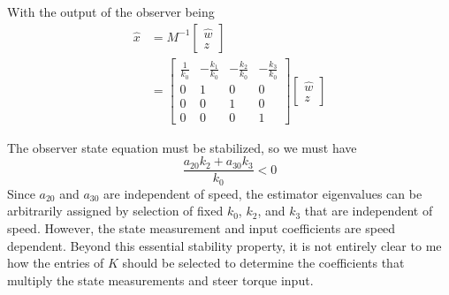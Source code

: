 \documentclass[letterpaper,11pt]{article}
\begin{document}
With the output of the observer being
\begin{align*}
\hat{x} &= M^{-1} \left[\begin{smallmatrix}\hat{w} \\ z\end{smallmatrix}\right] \\
  &= \left[\begin{smallmatrix}\frac{1}{k_{0}} & - \frac{k_{1}}{k_{0}} & -
  \frac{k_{2}}{k_{0}} & - \frac{k_{3}}{k_{0}}\\0 & 1 & 0 & 0\\0 & 0 & 1 & 0\\0
  & 0 & 0 & 1\end{smallmatrix}\right]\left[\begin{smallmatrix}\hat{w} \\ z\end{smallmatrix}\right]
\end{align*}

The observer state equation must be stabilized, so we must have
\begin{equation*}
\frac{a_{20} k_{2} + a_{30} k_{3}}{k_{0}} < 0
\end{equation*}
Since $a_{20}$ and $a_{30}$ are independent of speed, the estimator eigenvalues
can be arbitrarily assigned by selection of fixed $k_0$, $k_2$, and $k_3$ that
are independent of speed.  However, the state measurement and input
coefficients are speed dependent.  Beyond this essential stability property, it
is not entirely clear to me how the entries of $K$ should be selected to
determine the coefficients that multiply the state measurements and steer torque
input.

\end{document}
